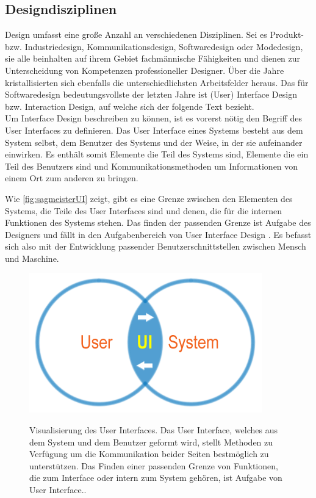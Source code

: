 \subsection{Designdisziplinen}
Design umfasst eine große Anzahl an verschiedenen Disziplinen. Sei es Produkt- bzw. Industriedesign, Kommunikationsdesign, Softwaredesign oder Modedesign, sie alle beinhalten auf ihrem Gebiet fachmännische Fähigkeiten und dienen zur Unterscheidung von Kompetenzen professioneller Designer. Über die Jahre kristallisierten sich ebenfalls die unterschiedlichsten Arbeitsfelder heraus. Das für Softwaredesign bedeutungsvollste der letzten Jahre ist (User) Interface Design bzw. Interaction Design, auf welche sich der folgende Text bezieht.\\
Um Interface Design beschreiben zu können, ist es vorerst nötig den Begriff des User Interfaces zu definieren. Das User Interface eines Systems besteht aus dem System selbst, dem Benutzer des Systems und der Weise, in der sie aufeinander einwirken. Es enthält somit Elemente die Teil des Systems sind, Elemente die ein Teil des Benutzers sind und Kommunikationsmethoden um Informationen von einem Ort zum anderen zu bringen.

\medskip Wie \autoref{fig:sagmeisterUI} zeigt, gibt es eine Grenze zwischen den Elementen des Systems, die Teile des User Interfaces sind und	denen, die für	die	internen Funktionen des Systems stehen. Das finden der passenden Grenze ist Aufgabe des	Designers und fällt	in den Aufgabenbereich	von	User Interface Design \citep{Barfield:1993}. Es befasst sich also mit der Entwicklung passender Benutzerschnittstellen zwischen Mensch und Maschine.

\begin{figure}
	\begin{center}
        {\includegraphics[width=.7\linewidth]{gfx/sagmeisterUI}}
	\end{center}
		\caption[Visualisierung des User Interfaces \newline \citep{Sagmeister:2008}]{Visualisierung des User Interfaces. Das User Interface, welches aus dem System und dem Benutzer geformt wird, stellt Methoden zu Verfügung um die Kommunikation beider Seiten bestmöglich zu unterstützen. Das Finden einer passenden Grenze von Funktionen, die zum Interface oder intern zum System gehören, ist Aufgabe von User Interface..}\label{fig:sagmeisterUI}
\end{figure}

